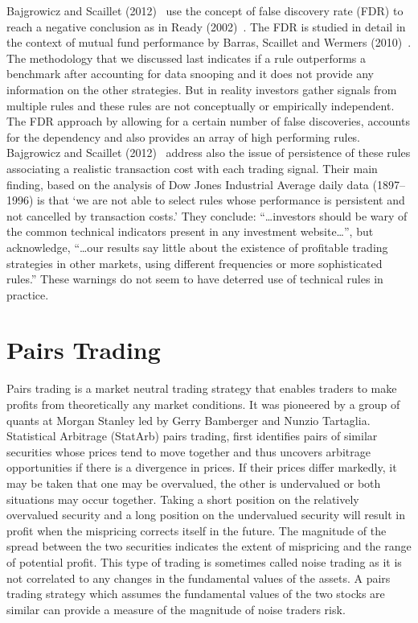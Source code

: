 Bajgrowicz and Scaillet (2012)~\cite{bajgrowicz2012technical} use the concept of false discovery rate (FDR) to reach a negative conclusion as in Ready (2002)~\cite{ready}. The FDR is studied in detail in the context of mutual fund performance by Barras, Scaillet and Wermers (2010)~\cite{barras2010false}. The methodology that we discussed last indicates if a rule outperforms a benchmark after accounting for data snooping and it does not provide any information on the other strategies. But in reality investors gather signals from multiple rules and these rules are not conceptually or empirically independent. The FDR approach by allowing for a certain number of false discoveries, accounts for the dependency and also provides an array of high performing rules. Bajgrowicz and Scaillet (2012)~\cite{bajgrowicz2012technical} address also the issue of persistence of these rules associating a realistic transaction cost with each trading signal. Their main finding, based on the analysis of Dow Jones Industrial Average daily data (1897--1996) is that `we are not able to select rules whose performance is persistent and not cancelled by transaction costs.' They conclude: ``\dots investors should be wary of the common technical indicators present in any investment website\dots'', but acknowledge, ``\dots our results say little about the existence of profitable trading strategies in other markets, using different frequencies or more sophisticated rules.'' These warnings do not seem to have deterred use of technical rules in practice.



\section{Pairs Trading}

Pairs trading is a market neutral trading strategy that enables traders to make profits from theoretically any market conditions. It was pioneered by a group of quants at Morgan Stanley led by Gerry Bamberger and Nunzio Tartaglia. Statistical Arbitrage (StatArb) pairs trading, first identifies pairs of similar securities whose prices tend to move together and thus uncovers arbitrage opportunities if there is a divergence in prices. If their prices differ markedly, it may be taken that one may be overvalued, the other is undervalued or both situations may occur together. Taking a short position on the relatively overvalued security and a long position on the undervalued security will result in profit when the mispricing corrects itself in the future. The magnitude of the spread between the two securities indicates the extent of mispricing and the range of potential profit. This type of trading is sometimes called noise trading as it is not correlated to any changes in the fundamental values of the assets. A pairs trading strategy which assumes the fundamental values of the two stocks are similar can provide a measure of the magnitude of noise traders risk.


